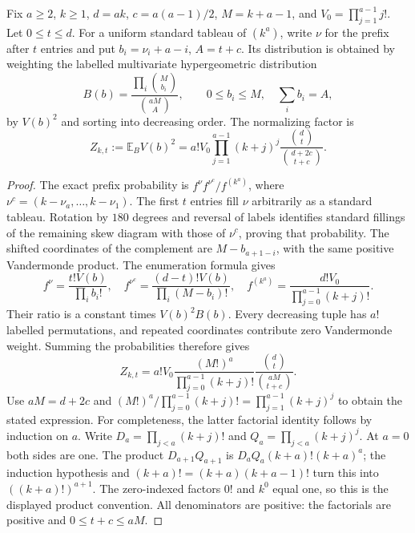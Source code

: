\begin{lemma}
\label{lem:prefix-distribution}
\leanok
Fix $a\geq2$, $k\geq1$, $d=ak$, $c=a(a-1)/2$, $M=k+a-1$,
and $V_0=\prod_{j=1}^{a-1}j!$. Let $0\leq t\leq d$. For a uniform standard tableau of
$(k^a)$, write $\nu$ for the prefix after $t$ entries and put
$b_i=\nu_i+a-i$, $A=t+c$. Its distribution is obtained by weighting
the labelled multivariate hypergeometric distribution
\[
 B(b)=\frac{\prod_i\binom M{b_i}}{\binom{aM}A},\qquad
 0\leq b_i\leq M,\quad \sum_i b_i=A,
\]
by $V(b)^2$ and sorting into decreasing order. The normalizing factor is
\[
 Z_{k,t}:=\mathbb E_B V(b)^2
 =a!V_0\prod_{j=1}^{a-1}(k+j)^j
   \frac{\binom dt}{\binom{d+2c}{t+c}}.
\]
\end{lemma}
\begin{proof}
The exact prefix probability is $f^\nu f^{\nu^c}/f^{(k^a)}$, where
$\nu^c=(k-\nu_a,\ldots,k-\nu_1)$. The first $t$ entries fill $\nu$
arbitrarily as a standard tableau. Rotation by $180$ degrees and
reversal of labels identifies standard fillings of the remaining
skew diagram with those of $\nu^c$, proving that probability.
The shifted coordinates of the complement are $M-b_{a+1-i}$, with
the same positive Vandermonde product. The enumeration formula gives
\[
 f^\nu=\frac{t!V(b)}{\prod_i b_i!},\quad
 f^{\nu^c}=\frac{(d-t)!V(b)}{\prod_i(M-b_i)!},\quad
 f^{(k^a)}=\frac{d!V_0}{\prod_{j=0}^{a-1}(k+j)!}.
\]
Their ratio is a constant times $V(b)^2B(b)$. Every decreasing tuple
has $a!$ labelled permutations, and repeated coordinates contribute
zero Vandermonde weight. Summing the probabilities therefore gives
\[
 Z_{k,t}=a!V_0\frac{(M!)^a}{\prod_{j=0}^{a-1}(k+j)!}
             \frac{\binom dt}{\binom{aM}{t+c}}.
\]
Use $aM=d+2c$ and
$(M!)^a/\prod_{j=0}^{a-1}(k+j)!=\prod_{j=1}^{a-1}(k+j)^j$
to obtain the stated expression. For completeness, the latter factorial
identity follows by induction on $a$. Write
$D_a=\prod_{j<a}(k+j)!$ and $Q_a=\prod_{j<a}(k+j)^j$.
At $a=0$ both sides are one. The product $D_{a+1}Q_{a+1}$ is
$D_aQ_a(k+a)!(k+a)^a$; the induction hypothesis and
$(k+a)!=(k+a)(k+a-1)!$ turn this into $((k+a)!)^{a+1}$.
The zero-indexed factors $0!$ and $k^0$ equal one, so this is the
displayed product convention. All denominators are positive: the
factorials are positive and $0\leq t+c\leq aM$.
\end{proof}

